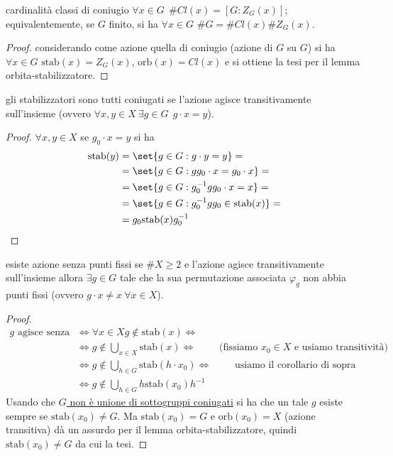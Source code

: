 \begin{example2}{cardinalità classi di coniugio}
    $\forall x \in G \ \ \#Cl(x) = [G : Z_G(x)]$; equivalentemente, se $G$ finito, si ha $\forall x \in G$ $\#G = \#Cl(x) \#Z_G(x)$.
\end{example2}
\begin{proof}
    considerando come azione quella di coniugio (azione di $G$ su $G$) si ha $\forall x \in G$ $\text{stab}(x) = Z_G(x)$, $\text{orb}(x) = Cl(x)$ e si ottiene la tesi per il lemma orbita-stabilizzatore.   
\end{proof}
\begin{corollary}{gli stabilizzatori sono tutti coniugati}
    se l'azione agisce transitivamente sull'insieme (ovvero $\forall x,y \in X \ \exists g \in G \ \ g \cdot x = y$).
\end{corollary}
\begin{proof} $\forall x,y \in X $ se $g_0 \cdot x = y$ si ha 
    \begin{align*}
        \text{stab}(y) & = \set{g \in G : g \cdot y = y} = \\
         & = \set{g \in G : gg_0 \cdot x = g_0 \cdot x} = \\
         & = \set{g \in G : g_0^{-1}gg_0 \cdot x = x} = \\
         & = \set{g \in G : g_0^{-1}gg_0 \in \text{stab}(x)} = \\
         & = g_0\text{stab}(x)g_0^{-1}
    \end{align*} 
\end{proof}
\begin{example2}{esiste azione senza punti fissi}
    se $\#X \geq 2$ e l'azione agisce transitivamente sull'insieme allora $\exists g \in G$ tale che la sua permutazione associata $\varphi_g$ non abbia punti fissi (ovvero $g\cdot x \neq x \ \forall x \in X$).
\end{example2}
\begin{proof}
    \begin{align*}
        g \text{ agisce senza punti fissi } & \iff \forall x \in X g \not \in \text{stab}(x) \iff \\
        & \iff g \not \in \bigcup_{x \in X} \text{stab}(x) \iff  \qquad \text{ (fissiamo $x_0 \in X$ e usiamo transitività)} \\
        & \iff g \not \in \bigcup_{h \in G} \text{stab}(h \cdot x_0) \iff \qquad \text{ usiamo il corollario di sopra} \\
        & \iff g \not \in \bigcup_{h \in G} h\text{stab}(x_0) h^{-1} 
    \end{align*}
    Usando che \hyperlink{es1}{$G$ non è unione di sottogruppi coniugati} si ha che un tale $g$ esiste sempre se $\text{stab}(x_0) \neq G$. Ma $\text{stab}(x_0) = G$ e $\text{orb}(x_0) = X$ (azione transitiva) dà un assurdo per il lemma orbita-stabilizzatore, quindi $\text{stab}(x_0) \neq G$ da cui la tesi. 
\end{proof}
